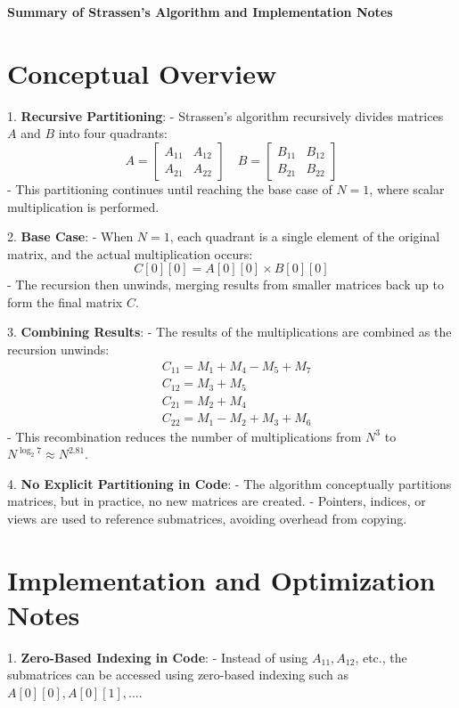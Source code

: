 \documentclass{article}
\begin{document}
\textbf{Summary of Strassen's Algorithm and Implementation Notes}

\section*{Conceptual Overview}
1. \textbf{Recursive Partitioning}:
    - Strassen’s algorithm recursively divides matrices \( A \) and \( B \) into four quadrants: 
      \[
      A = \begin{bmatrix} A_{11} & A_{12} \\ A_{21} & A_{22} \end{bmatrix} \quad B = \begin{bmatrix} B_{11} & B_{12} \\ B_{21} & B_{22} \end{bmatrix}
      \]
    - This partitioning continues until reaching the base case of \( N = 1 \), where scalar multiplication is performed.

2. \textbf{Base Case}:
    - When \( N = 1 \), each quadrant is a single element of the original matrix, and the actual multiplication occurs:
      \[
      C[0][0] = A[0][0] \times B[0][0]
      \]
    - The recursion then unwinds, merging results from smaller matrices back up to form the final matrix \( C \).

3. \textbf{Combining Results}:
    - The results of the multiplications are combined as the recursion unwinds:
    \[
    \begin{aligned}
    &C_{11} = M_1 + M_4 - M_5 + M_7 \\
    &C_{12} = M_3 + M_5 \\
    &C_{21} = M_2 + M_4 \\
    &C_{22} = M_1 - M_2 + M_3 + M_6 
    \end{aligned}
    \]
    - This recombination reduces the number of multiplications from \( N^3 \) to \( N^{\log_2 7} \approx N^{2.81} \).

4. \textbf{No Explicit Partitioning in Code}:
    - The algorithm conceptually partitions matrices, but in practice, no new matrices are created.
    - Pointers, indices, or views are used to reference submatrices, avoiding overhead from copying.

\section*{Implementation and Optimization Notes}

1. \textbf{Zero-Based Indexing in Code}:
    - Instead of using \( A_{11}, A_{12} \), etc., the submatrices can be accessed using zero-based indexing such as \( A[0][0], A[0][1], \ldots \).
\end{document}
